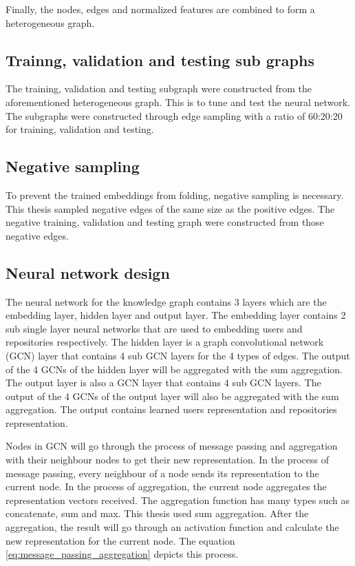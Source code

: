 \documentclass[11pt,twoside]{report}
\begin{document}
Finally, the nodes, edges and normalized features are combined to form a heterogeneous graph.

\subsection{Trainng, validation and testing sub graphs}
The training, validation and testing subgraph were constructed from the aforementioned heterogeneous graph. This is to tune and test the neural network. The subgraphs were constructed through edge sampling with a ratio of 60:20:20 for training, validation and testing.

\subsection{Negative sampling}
To prevent the trained embeddings from folding, negative sampling is necessary. This thesis sampled negative edges of the same size as the positive edges. The negative training, validation and testing graph were constructed from those negative edges.

\subsection{Neural network design}
The neural network for the knowledge graph contains 3 layers which are the embedding layer, hidden layer and output layer. The embedding layer contains 2 sub single layer neural networks that are used to embedding users and repositories respectively. The hidden layer is a graph convolutional network (GCN) \cite{kipf_semi-supervised_2017} layer that contains 4 sub GCN layers for the 4 types of edges. The output of the 4 GCNs of the hidden layer will be aggregated with the sum aggregation. The output layer is also a GCN layer that contains 4 sub GCN layers. The output of the 4 GCNs of the output layer will also be aggregated with the sum aggregation. The output contains learned users representation and repositories representation.

Nodes in GCN will go through the process of message passing and aggregation with their neighbour nodes to get their new representation. In the process of message passing, every neighbour of a node sends its representation to the current node. In the process of aggregation, the current node aggregates the representation vectors received. The aggregation function has many types such as concatenate, sum and max. This thesis used sum aggregation. After the aggregation, the result will go through an activation function and calculate the new representation for the current node. The equation \ref{eq:message_passing_aggregation} depicts this process.
\end{document}
